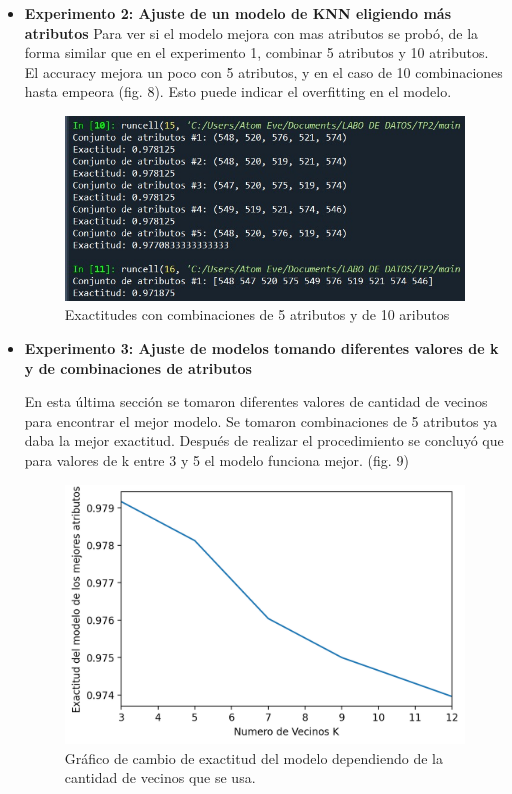 \documentclass[11pt,a4paper, twocolumn]{article}
\begin{document}
\begin{itemize}
    \item[]
       \textbf{Experimento 2: Ajuste de un modelo de KNN eligiendo más atributos}
Para ver si el modelo mejora con mas atributos se probó, de la forma similar que en el experimento 1, combinar 5 atributos y 10 atributos.
El accuracy mejora un poco con 5 atributos, y en el caso de 10 combinaciones hasta empeora (fig. 8). Esto puede indicar el overfitting en el modelo.
\begin{figure}[H]
	\centering
	\includegraphics[scale=0.6]{figuras/2a_2.jpg}
	\caption{Exactitudes con combinaciones de 5 atributos y de 10 aributos}
	\label{fig:8}
\end{figure}
\end{itemize}

\begin{itemize}
    \item []
    \textbf{Experimento 3: Ajuste de modelos tomando diferentes valores de k y de combinaciones de atributos}

En esta última sección se tomaron diferentes valores de cantidad de vecinos para encontrar el mejor modelo. Se tomaron combinaciones de 5 atributos ya daba la mejor exactitud. Después de realizar el procedimiento se concluyó que para valores de k entre 3 y 5 el modelo funciona mejor. (fig. 9)

\begin{figure}[H]
	\centering
	\includegraphics[scale=0.6]{figuras/2e.png}
	\caption{Gráfico de cambio de exactitud del modelo dependiendo de la cantidad de vecinos que se usa.}
	\label{fig:9}
\end{figure}

\end{itemize}
\end{document}
